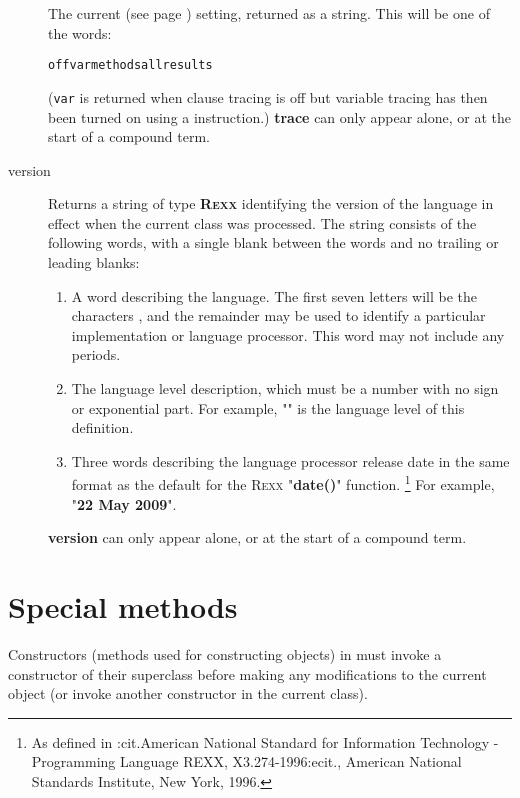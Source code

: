 \begin{description}
The current   (see page \pageref{reftrace})  setting,
returned as a \nr{} string.
This will be one of the words:
\begin{alltt}
off var methods all results
\end{alltt}

(\texttt{var} is returned when clause tracing is off but variable
tracing has then been turned on using a  instruction.)
 \textbf{trace} can only appear alone, or at the start of a
compound term.
\item[version]\label{refswvers}
 
Returns a string of type \textbf{R\textsc{exx}} identifying the version of the
\nr{} language in effect when the current class was processed.
The string consists of the following words, with a single blank between
the words and no trailing or leading blanks:
\begin{enumerate}
\item A word describing the language.  The first seven letters will be the
characters \textbf{\nr{}}, and the remainder may be used to identify
a particular implementation or language processor.
This word may not include any periods.
\item 
The language level description, which must be a number with no sign or
exponential part.
For example, "\textbf{\nrversion{}}" is the language level of this
definition.
\item 
Three words describing the language processor release date in
the same format as the default for the R\textsc{exx} "\textbf{date()}"
function.
\footnote{
As defined in :cit.American National Standard for Information
Technology - Programming Language REXX, X3.274-1996:ecit., American
National Standards Institute, New York, 1996.
}
For example, "\textbf{22 May 2009}".
\end{enumerate}
 \textbf{version} can only appear alone, or at the start of a
compound term.
\end{description}
\section{Special methods}\label{refspecm}
 
Constructors (methods used for constructing objects) in \nr{}
must invoke a constructor of their superclass before making any
modifications to the current object (or invoke another constructor in
the current class).
 
